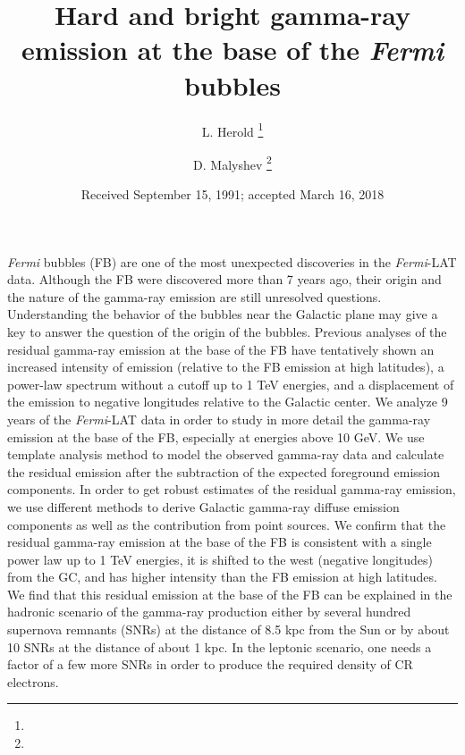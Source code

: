 \documentclass[onecolumn, 12pt]{aa}
\newcommand{\Fermi}{\textit{Fermi}\xspace}
\begin{document}
 


   \title{Hard and bright gamma-ray emission at the base of the \Fermi bubbles}



   \author{L. Herold \thanks{}
          \and
          D. Malyshev \thanks{}
          }


   \date{Received September 15, 1991; accepted March 16, 2018}

 
  \abstract
   {\Fermi bubbles (FB) are one of the most unexpected discoveries in the \Fermi-LAT data. 
   Although the FB were discovered more than 7 years ago, their origin and the nature of the gamma-ray emission are still unresolved questions.
   Understanding the behavior of the bubbles near the Galactic plane may give a key to answer the question of the origin of the bubbles.
   Previous analyses of the residual gamma-ray emission at the base of the FB have tentatively shown an increased intensity of emission
   (relative to the FB emission at high latitudes), a power-law spectrum without a cutoff up to 1 TeV energies, 
   and a displacement of the emission to negative longitudes relative to the Galactic center.
   }
   {We analyze 9 years of the \Fermi-LAT data in order to study in more detail the gamma-ray emission at the base of the FB,
   especially at energies above 10 GeV.
   }
   { We use template analysis method to model the observed gamma-ray data 
   and calculate the residual emission after the subtraction of the expected foreground emission components.
   In order to get robust estimates of the residual gamma-ray emission, 
   we use different methods to derive Galactic gamma-ray diffuse emission components as well as the contribution from point sources.
   }
   {We confirm that the residual gamma-ray emission at the base of the FB is consistent with a single power law up to 1 TeV energies,
   it is shifted to the west (negative longitudes) from the GC, and has higher intensity than the FB emission at high latitudes.
   We find that this residual emission at the base of the FB can be explained in the hadronic scenario of the gamma-ray production 
   either by several hundred supernova remnants (SNRs) at the distance of  8.5 kpc from the Sun
   or by about 10 SNRs at the distance of about 1 kpc.
   In the leptonic scenario, one needs a factor of a few more SNRs in order to 
   produce the required density of CR electrons.
   }
   {}
\end{document}
